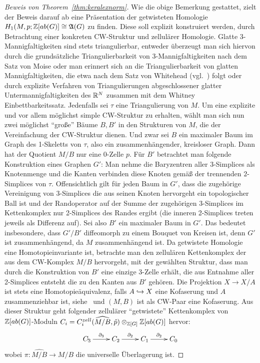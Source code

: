 \begin{proof}[Beweis von Theorem~\ref{thm:keralexnorm}]
	Wie die obige Bemerkung gestattet, zielt der Beweis darauf ab eine Präsentation der getwisteten Homologie $H_1(M,p;\mathbb{Z}[ab(G)]\cong \mathfrak A(G)$ zu finden. Diese soll explizit konstruiert werden, durch Betrachtung einer konkreten CW-Struktur und zellulärer Homologie. Glatte 3-Mannigfaltigkeiten sind stets triangulierbar, entweder überzeugt man sich hiervon durch die grundsätzliche Triangulierbarkeit von 3-Mannigfaltigkeiten nach dem Satz von Moise oder man erinnert sich an die Triangulierbarkeit von glatten Mannigfaltigkeiten, die etwa nach dem Satz von Whitehead (vgl.~\cite{WhiteheadJ.H.C..1940}) folgt oder durch explizite Verfahren von Triangulierungen abgeschlossener glatter Untermannigfaltigkeiten des $\mathbb{R}^N$ zusammen mit dem Whitney Einbettbarkeitssatz. Jedenfalls sei $\tau$ eine Triangulierung von $M$. Um eine explizite und vor allem möglichst simple CW-Struktur zu erhalten, wählt man sich nun zwei möglichst "`große"' Bäume $B,B'$ in den Strukturen von $M$, die der Vereinfachung der CW-Struktur dienen. Und zwar sei $B$ ein maximaler Baum im Graph des 1-Skeletts von $\tau$, also ein zusammenhängender, kreisloser Graph. Dann hat der Quotient $M/B$ nur eine 0-Zelle $p$. Für $B'$ betrachtet man folgende Konstruktion eines Graphen $G'$: Man nehme die Baryzentren aller $3$-Simplices als Knotenmenge und die Kanten verbinden diese Knoten gemäß der trennenden $2$-Simplices von $\tau$. Offensichtlich gilt für jeden Baum in $G'$, dass die zugehörige Vereinigung von $3$-Simplices die aus seinen Knoten hervorgeht ein topologischer Ball ist und der Randoperator auf der Summe der zugehörigen 3-Simplices im Kettenkomplex nur 2-Simplices des Randes ergibt (die inneren 2-Simplices treten jeweils als Differenz auf). Sei also $B'$ ein maximaler Baum in $G'$. Das bedeutet insbesondere, dass $G'/B'$ diffeomorph zu einem Bouquet von Kreisen ist, denn $G'$ ist zusammenhängend, da $M$ zusammenhängend ist. Da getwistete Homologie eine Homotopieinvariante ist, betrachte man den zellulären Kettenkomplex der aus dem CW-Komplex $M/B$ hervorgeht, mit der gewählten Struktur, dass man durch die Konstruktion von $B'$ eine einzige 3-Zelle erhält, die aus Entnahme aller 2-Simplices entsteht die zu den Kanten aus $B'$ gehören. Die Projektion $X \to X/A$ ist stets eine Homotopieäquivalenz, falls $A\hookrightarrow X$ eine Kofaserung und $A$ zusammenziehbar ist, siehe~\cite[Chapter 1, Corollary 5.13]{Whitehead.1995} und $(M,B)$ ist als CW-Paar eine Kofaserung. Aus dieser Struktur geht folgender zellulärer "`getwistete"' Kettenkomplex von $\mathbb{Z}[ab(G)]$-Moduln $C_i=C_i^{zell}(\widehat{M/B},\hat p)\otimes_{\mathbb{Z}[G]}\mathbb{Z}[ab(G)]$ hervor:
	\[
		\begin{xy}
		\xymatrix{C_3 \ar[r]^{\partial_3}  &C_2 \ar[r]^{\partial_2}  &C_1 \ar[r]^{\partial_2} &C_0 },
		\end{xy}
	\]
	wobei $\pi: \widehat{M/B} \to M/B$ die universelle Überlagerung ist.


\end{proof}
